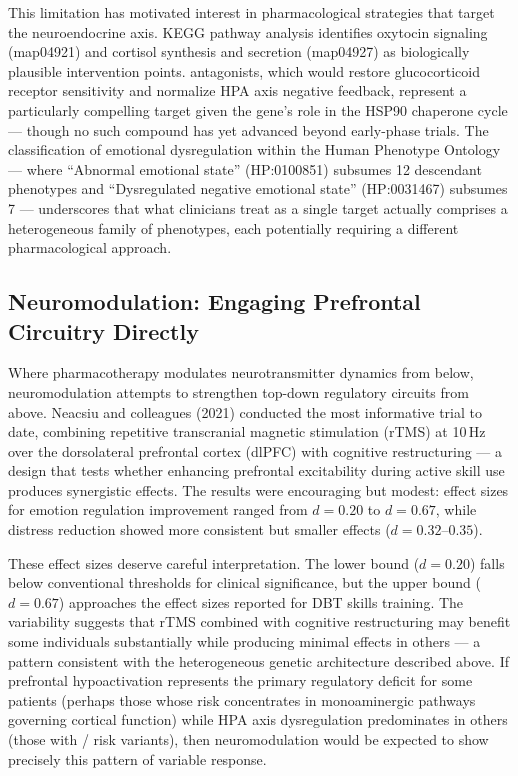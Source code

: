 This limitation has motivated interest in pharmacological strategies that
target the neuroendocrine axis.
KEGG pathway analysis identifies oxytocin signaling (map04921) and cortisol
synthesis and secretion (map04927) as biologically plausible intervention
points.\cite{kanehisa2023}
 antagonists, which would restore glucocorticoid receptor
sensitivity and normalize HPA axis negative feedback, represent a particularly
compelling target given the gene's role in the HSP90 chaperone cycle —
though no such compound has yet advanced beyond early-phase trials.\cite{udalov2026}
The classification of emotional dysregulation within the Human Phenotype
Ontology — where ``Abnormal emotional state'' (HP:0100851) subsumes 12
descendant phenotypes and ``Dysregulated negative emotional state''
(HP:0031467) subsumes 7 — underscores that what clinicians treat as a single
target actually comprises a heterogeneous family of phenotypes, each
potentially requiring a different pharmacological approach.\cite{kohler2017}

\subsection*{Neuromodulation: Engaging Prefrontal Circuitry Directly}

Where pharmacotherapy modulates neurotransmitter dynamics from below,
neuromodulation attempts to strengthen top-down regulatory circuits from above.
Neacsiu and colleagues (2021) conducted the most informative trial to date,
combining repetitive transcranial magnetic stimulation (rTMS) at 10\,Hz over
the dorsolateral prefrontal cortex (dlPFC) with cognitive restructuring — a
design that tests whether enhancing prefrontal excitability during active
skill use produces synergistic effects.\cite{neacsiu2021}
The results were encouraging but modest: effect sizes for emotion regulation
improvement ranged from $d = 0.20$ to $d = 0.67$, while distress reduction
showed more consistent but smaller effects ($d = 0.32$--$0.35$).

These effect sizes deserve careful interpretation.
The lower bound ($d = 0.20$) falls below conventional thresholds for clinical
significance, but the upper bound ($d = 0.67$) approaches the effect sizes
reported for DBT skills training.
The variability suggests that rTMS combined with cognitive restructuring may
benefit some individuals substantially while producing minimal effects in
others — a pattern consistent with the heterogeneous genetic architecture
described above.
If prefrontal hypoactivation represents the primary regulatory deficit for
some patients (perhaps those whose risk concentrates in monoaminergic pathways
governing cortical function) while HPA axis dysregulation predominates in
others (those with / risk variants), then
neuromodulation would be expected to show precisely this pattern of variable
response.\cite{neacsiu2021}

